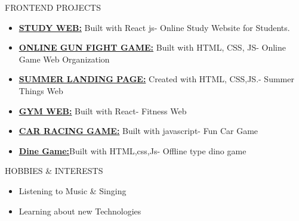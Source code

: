 \documentclass{resume}
\begin{document}
\begin{rSection}{ FRONTEND PROJECTS}
    \begin{itemize}
        \item \textbf{\href{https://github.com/trishaamandal/CD-studiesPlans}{STUDY WEB:}} {Built with React js- Online Study Website for Students.}
        \vspace{-0.6em}
        \item \textbf{\href{https://github.com/trishaamandal/gameweb}{ONLINE GUN FIGHT GAME:}} { Built with HTML, CSS, JS- Online Game Web Organization}
        \vspace{-0.6em}
        \item \textbf{\href{https://github.com/trishaamandal/landingpage_summer}{SUMMER LANDING PAGE:}} {Created with HTML, CSS,JS.- Summer Things Web}
        \vspace{-0.6em}
        \item \textbf{\href{https://github.com/trishaamandal/GYM-group}{GYM WEB:}} {Built with React- Fitness Web}
        \vspace{-0.6em}
        \item \textbf{\href{https://github.com/trishaamandal/car_racing}{CAR RACING GAME:}} {Built with javascript- Fun Car Game}
        \vspace{-0.6em}
        \item \textbf{\href{https://github.com/trishaamandal/Dine_game}{Dine Game:}}{Built with HTML,css,Js- Offline type dino game }
        \vspace{-0.6em}

    \end{itemize}
\end{rSection}
\vspace{-0.4em}

\begin{rSection}{HOBBIES \& INTERESTS}
    \begin{itemize}
        \item Listening to Music \& Singing
              \vspace{-0.4em}
        \item Learning about new Technologies
    \end{itemize}
\end{rSection}
\vspace{-0.4em}

\end{document}
